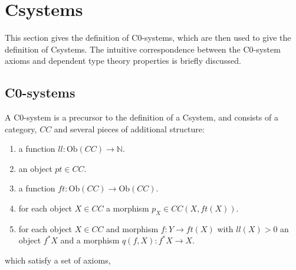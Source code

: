 \section{Csystems}
This section gives the definition of C0-systems, which are then used to give the
definition of Csystems\cite{cartmellcsystems1}\cite{cartmellcsystems2}. The
intuitive correspondence between the C0-system axioms and dependent type theory
properties is briefly discussed.

\subsection{C0-systems}
A C0-system\cite{voevodskycsystems} is a precursor to the definition of a
Csystem, and consists of a category, $CC$ and several pieces of additional
structure:
\begin{enumerate}
    \item a function $ll: \text{Ob}(CC)\to \mathbb{N}$.
    \item an object $pt\in CC$.
    \item a function $ft: \text{Ob}(CC)\to \text{Ob}(CC)$.
    \item for each object $X\in CC$ a morphism $p_X\in CC(X, ft(X))$.
    \item for each object $X\in CC$ and morphism $f: Y\to ft(X)$ with $ll(X) >
    0$ an object $f^*X$ and a morphism $q(f, X) : f^*X\to X$.
\end{enumerate}
which satisfy a set of axioms,
